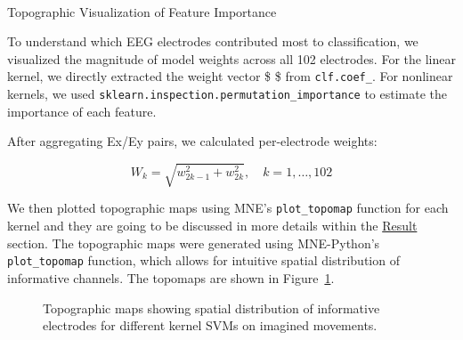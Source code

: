 \documentclass[
  letterpaper,
  DIV=11,
  numbers=noendperiod]{scrartcl}
\makeatletter
\let\oldparagraph\paragraph
\renewcommand{\paragraph}{
    \@ifstar
      \xxxParagraphStar
      \xxxParagraphNoStar
  }
\newcommand{\xxxParagraphStar}[1]{\oldparagraph*{#1}\mbox{}}
\newcommand{\xxxParagraphNoStar}[1]{\oldparagraph{#1}\mbox{}}
\makeatother
\begin{document}
\paragraph{Topographic Visualization of Feature
Importance}\label{topographic-visualization-of-feature-importance}

To understand which EEG electrodes contributed most to classification,
we visualized the magnitude of model weights across all 102 electrodes.
For the linear kernel, we directly extracted the weight vector \$
 \$ from \texttt{clf.coef\_}. For nonlinear kernels, we used
\texttt{sklearn.inspection.permutation\_importance} to estimate the
importance of each feature.

After aggregating Ex/Ey pairs, we calculated per-electrode weights:

\[
W_k = \sqrt{w_{2k-1}^2 + w_{2k}^2}, \quad k = 1, \dots, 102
\]

We then plotted topographic maps using MNE's \texttt{plot\_topomap}
function for each kernel and they are going to be discussed in more
details within the \href{@sec-results}{Result} section. The topographic
maps were generated using MNE-Python's \texttt{plot\_topomap} function,
which allows for intuitive spatial distribution of informative channels.
The topomaps are shown in Figure~\ref{fig-topomap-kernels}.

\begin{figure}


\caption{\label{fig-topomap-kernels}Topographic maps showing spatial
distribution of informative electrodes for different kernel SVMs on
imagined movements.}

\end{figure}%
\end{document}
